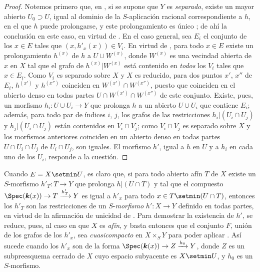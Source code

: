 \begin{proof}
Notemos primero que, en , si se supone que $Y$ es \emph{separado}, existe un mayor abierto $U_0\supset U$, igual al dominio de la $S$-aplicación racional correspondiente a $h$, en el que $h$ puede prolongarse, y este prolongamiento es único ; de ahí la conclusión en este caso, en virtud de .
En el caso general, sea $E_i$ el conjunto de los $x\in E$ tales que $(x,h'_x(x))\in V_i$.
En virtud de , para todo $x\in E$ existe un prolongamiento $h^{(x)}$ de $h$ a $U\cup W^{(x)}$, donde $W^{(x)}$ es una vecindad abierta de $x$ en $X$ tal que el grafo de $h^{(x)}|W^{(x)}$ está contenido en \emph{todos} los $V_i$ tales que $x\in E_i$.
Como $V_i$ es separado sobre $X$ y $X$ es reducido, para dos puntos $x'$, $x''$ de $E_i$, $h^{(x')}$ y $h^{(x'')}$ coinciden en $W^{(x')}\cap W^{(x'')}$, puesto que
coinciden en el abierto denso en todas partes $U\cap W^{(x')}\cap W^{(x'')}$ de este conjunto.
Existe, pues, un morfismo $h_i:U\cup U_i\to Y$ que prolonga $h$ a un abierto $U\cup U_i$ que contiene $E_i$; además, para todo par de índices $i$, $j$, los grafos de las restricciones $h_i|(U_i\cap U_j)$ y $h_j|(U_i\cap U_j)$ están contenidos en $V_i\cap V_j$; como $V_i\cap V_j$ es separado sobre $X$ y los morfismos anteriores coinciden en un abierto denso en todas partes $U\cap U_i\cap U_j$ de $U_i\cap U_j$, son iguales.
El morfismo $h'$, igual a $h$ en $U$ y a $h_i$ en cada uno de los $U_i$, responde a la cuestión.
\end{proof}

\begin{remark}[20.4.8]
\label{IV.20.4.8}
Cuando $E=X\setmin U$, es claro que, si para todo abierto afín $T$ de $X$ existe un $S$-morfismo $h'_T:T\to Y$ que prolonga $h|(U\cap T)$ y tal que el compuesto $\Spec(\boldsymbol{k}(x))\to T\xrightarrow{h'_T}Y$ es igual a $h'_x$ para todo $x\in T\setmin(U\cap T)$, entonces los $h'_T$ son las restricciones de un $S$-\emph{morfismo} $h':X\to Y$ definido en todas partes, en virtud de la afirmación de unicidad de .
Para demostrar la existencia de $h'$, se reduce, pues, al caso en que $X$ es \emph{afín}, y basta entonces que el conjunto $F$, unión de los grafos de los $h'_x$, sea \emph{cuasicompacto} en $X\times_S Y$ para poder aplicar .
Así sucede cuando los $h'_x$ son de la forma $\Spec(\boldsymbol{k}(x))\to Z\xrightarrow{h_0}Y$, donde $Z$ es un subpreesquema cerrado de $X$ cuyo espacio subyacente es $X\setmin U$, y $h_0$ es un $S$-morfismo.
\end{remark}

